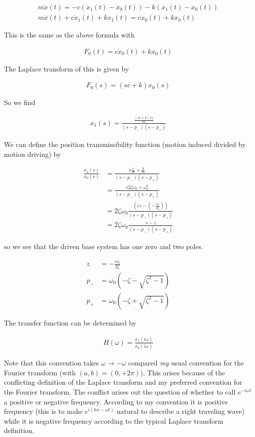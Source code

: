 \documentclass[12pt]{article}
\begin{document}
\begin{align}
m \ddot{x}(t) = -c(\dot{x}_1(t) - \dot{x}_0(t)) - k(x_1(t)-x_0(t))\\
m\ddot{x}(t) + c\dot{x}_1(t) + kx_1(t) = c \dot{x}_0(t) + k x_0(t)
\end{align} 

This is the same as the above formula with

\begin{align}
F_0(t) = c \dot{x}_0(t) + k x_0(t)
\end{align}

The Laplace transform of this is given by

\begin{align}
F_0(s) = (sc + k)x_0(s)
\end{align}

So we find

\begin{align}
x_1(s) = \frac{\frac{(sc + k)x_0}{m}}{(s-p_-)(s-p_+)}
\end{align}

We can define the position transmissibility function (motion induced divided by motion driving) by

\begin{align}
\frac{x_1(s)}{x_0(s)} &= \frac{s \frac{c}{m} + \frac{k}{m}}{(s-p_-)(s-p_+)}\\
&= \frac{s2\zeta \omega_0 + \omega_0^2}{(s-p_-)(s-p_+)}\\
&= 2 \zeta \omega_0 \frac{\left((s - \left(-\frac{\omega_0}{2 \zeta}\right)\right)}{(s-p_-)(s-p_+)}\\
&= 2\zeta \omega_0 \frac{s-z}{(s-p_-)(s-p_+)}
\end{align}

so we see that the driven base system has one zero and two poles.

\begin{align}
z &= -\frac{\omega_0}{2\zeta}\\
p_- &= \omega_0(-\zeta - \sqrt{\zeta^2 -1})\\
p_+ &= \omega_0(-\zeta + \sqrt{\zeta^2-1})
\end{align}

The transfer function can be determined by

\begin{align}
H(\omega) = \frac{x_1(i\omega)}{x_0(i\omega)}
\end{align}

Note that this convention takes $\omega \rightarrow -\omega$ compared \textit{my} usual convention for the Fourier transform (with $(a,b) = (0,+2\pi)$). This arises because of the conflicting definition of the Laplace transform and my preferred convention for the Fourier transform. The conflict arises out the question of whether to call $e^{-i\omega t}$ a positive or negative frequency. According to my convention it is positive frequency (this is to make $e^{i(kx-\omega t)}$ natural to describe a right traveling wave) while it is negative frequency according to the typical Laplace transform definition.
\end{document}
